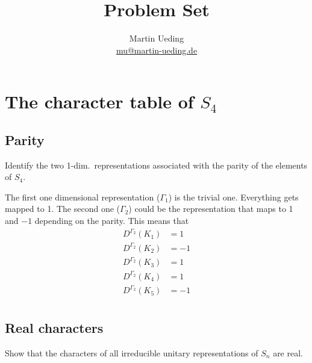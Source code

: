 \documentclass[11pt, english, fleqn, DIV=15, headinclude, BCOR=1cm]{scrartcl}
\title{Problem Set \arabic{problemset}}
\author{
    Martin Ueding \\ \small{\href{mailto:mu@martin-ueding.de}{mu@martin-ueding.de}}
}
\begin{document}
\maketitle

\section{The character table of $S_4$}

\subsection{Parity}

\begin{problem}
    Identify the two 1-dim.\ representations associated with the parity of the
    elements of $S_4$.
\end{problem}

The first one dimensional representation ($\Gamma_1$) is the trivial one.
Everything gets mapped to 1. The second one ($\Gamma_2$) could be the
representation that maps to 1 and $-1$ depending on the parity. This means that
\begin{align*}
    D^{\Gamma_2}(K_1)& = 1 \\
    D^{\Gamma_2}(K_2)& = -1 \\
    D^{\Gamma_2}(K_3)& = 1 \\
    D^{\Gamma_2}(K_4)& = 1 \\
    D^{\Gamma_2}(K_5)& = -1 \\
\end{align*}

\subsection{Real characters}

\begin{problem}
    Show that the characters of all irreducible unitary representations of
    $S_n$ are real.
\end{problem}
\end{document}
